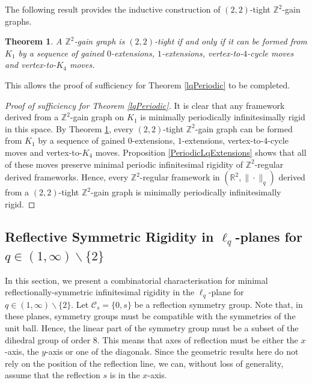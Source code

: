 \documentclass[reqno,a4paper,10pt]{article}
\newtheorem{theorem}{Theorem}[section]
\theoremstyle{definition}
\theoremstyle{remark}
\numberwithin{equation}{section}
\numberwithin{figure}{section}
\numberwithin{table}{section}
\newcommand{\R}{\mathbb{R}}
\newcommand{\Z}{\mathbb{Z}}
\begin{document}
    
    The following result provides the inductive construction of $(2,2)$-tight $\Z^2$-gain graphs.
    \begin{theorem}\cite[Theorem 15]{Surfaces}\label{PeriodicLqInduction}
		A $\Z^2$-gain graph is $(2,2)$-tight if and only if it can be formed from $K_1$ by a sequence of gained $0$-extensions, $1$-extensions, vertex-to-$4$-cycle moves and vertex-to-$K_4$ moves.
	\end{theorem}
    This allows the proof of sufficiency for Theorem \ref{lqPeriodic} to be completed.
    \begin{proof}[Proof of sufficiency for Theorem \ref{lqPeriodic}]
        It is clear that any framework derived from a $\Z^2$-gain graph on $K_1$ is minimally periodically infinitesimally rigid in this space.  By Theorem \ref{PeriodicLqInduction}, every $(2,2)$-tight $\Z^2$-gain graph can be formed from $K_1$ by a sequence of gained $0$-extensions, $1$-extensions, vertex-to-$4$-cycle moves and vertex-to-$K_4$ moves. Proposition \ref{PeriodicLqExtensions} shows that all of these moves preserve minimal periodic infinitesimal rigidity of $\Z^2$-regular derived frameworks. Hence, every $\Z^2$-regular framework in $(\R^2,\|\cdot\|_q)$ derived from a $(2,2)$-tight $\Z^2$-gain graph is minimally periodically infinitesimally rigid.
    \end{proof}

    \subsection{Reflective Symmetric Rigidity in $\ell_q$-planes for $q\in(1,\infty)\backslash\{2\}$}\label{SectionLqReflection}
    In this section, we present a combinatorial characterisation for minimal reflectionally-symmetric infinitesimal rigidity in the $\ell_q$-plane for $q\in(1,\infty)\backslash\{2\}$. Let $\mathcal{C}_s=\{0,s\}$ be a reflection symmetry group. Note that, in these planes, symmetry groups must be compatible with the symmetries of the unit ball. Hence, the linear part of the symmetry group must be a subset of the dihedral group of order $8$. This means that axes of reflection must be either the $x$-axis, the $y$-axis or one of the diagonals. Since the geometric results here do not rely on the position of the reflection line, we can, without loss of generality, assume that the reflection $s$ is in the $x$-axis.
\end{document}
